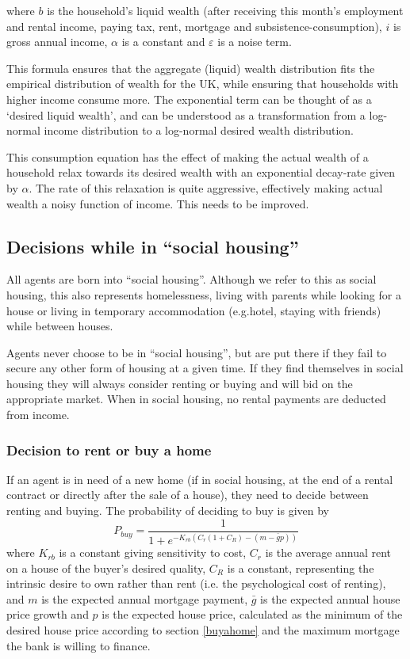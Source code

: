 \documentclass{article}
\begin{document}
where $b$ is the household's liquid wealth (after receiving this month's employment and rental income, paying tax, rent, mortgage and subsistence-consumption), $i$ is gross annual income, $\alpha$ is a constant and $\varepsilon$ is a noise term.

This formula ensures that the aggregate (liquid) wealth distribution fits the empirical distribution of wealth for the UK, while ensuring that households with higher income consume more. The exponential term can be thought of as a `desired liquid wealth', and can be understood as a transformation from a log-normal income distribution to a log-normal desired wealth distribution.

This consumption equation has the effect of making the actual wealth of a household relax towards its desired wealth with an exponential decay-rate given by $\alpha$. The rate of this relaxation is quite aggressive, effectively making actual wealth a noisy function of income. This needs to be improved.

\subsection{Decisions while in ``social housing''}
All agents are born into ``social housing''. Although we refer to this as social housing, this also represents homelessness, living with parents while looking for a house or living in temporary accommodation (e.g.hotel, staying with friends) while between houses.

Agents never choose to be in ``social housing'', but are put there if they fail to secure any other form of housing at a given time. If they find themselves in social housing they will always consider renting or buying and will bid on the appropriate market. When in social housing, no rental payments are deducted from income.

\subsubsection{Decision to rent or buy a home}
\label{rentorbuy}
If an agent is in need of a new home (if in social housing, at the end of a rental contract or directly after the sale of a house), they need to decide between renting and buying. The probability of deciding to buy is given by
\[
P_{buy} = \frac{1}{1 + e^{-K_{rb}(C_{r}(1+C_R) - (m - \bar{g}p))}}
\]
where $K_{rb}$ is a constant giving sensitivity to cost, $C_{r}$ is the average annual rent on a house of the buyer's desired quality, $C_R$ is a constant, representing the intrinsic desire to own rather than rent (i.e. the psychological cost of renting), and $m$ is the expected annual mortgage payment, $\bar{g}$ is the expected annual house price growth and $p$ is the expected house price, calculated as the minimum of the desired house price according to section \ref{buyahome} and the maximum mortgage the bank is willing to finance.
\end{document}
